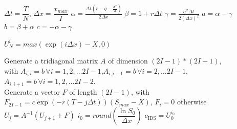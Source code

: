 \begin{algorithm}[H]
	$\Delta t = \dfrac{T}{N}$, 
	$\Delta x = \dfrac{x_{max}}{I}$\;
	$\alpha = \frac{\Delta t(r - q - \frac{\sigma^{2}}{2})}{2\Delta x}$\;
	$\beta = 1+ r \Delta t$\;
	$\gamma = \frac{\sigma^{2}\Delta t}{2(\Delta x)^{2}}$\;
	$a = \alpha - \gamma$\;
	$b = \beta + \alpha$\;
	$c = -\alpha - \gamma$\;
	
	 {
		$U_{N}^{i} = max(\exp(i\Delta x) - X, 0)$\;
	}
	
	Generate a tridiagonal matrix $A$ of dimension $(2I-1) * (2I-1)$, \\
	with $A_{i,i} = b\, \forall i = 1, 2, \dots 2I-1$,$A_{i,i-1} = b\, \forall i = 2, \dots 2I-1$, $A_{i,i+1} = b\, \forall i = 1, 2, \dots 2I-2$.\\
	
	 {
		Generate a vector $F$ of length $(2I-1)$, with $F_{2I-1} = c\exp(-r(T-j \Delta t))(S_{max} - X)$, $F_{i} = 0$ otherwise\;
		$U_{j} = A^{-1} (U_{j+1} + F)$\;
	}
	$i_0 = round \left (\dfrac{\ln{S_0}}{\Delta x} \right )$\;
	$c_{\text{IDS}} = U_0^{i_0}$\;
	
\end{algorithm}

